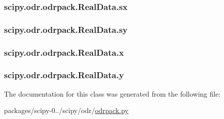 \subsubsection[{sx}]{\setlength{\rightskip}{0pt plus 5cm}scipy.\+odr.\+odrpack.\+Real\+Data.\+sx}\label{classscipy_1_1odr_1_1odrpack_1_1RealData_a0b61f9cdaabaac23a3a2a46a0719cf37}
\hypertarget{classscipy_1_1odr_1_1odrpack_1_1RealData_a56b11a5d3d7b1d9eaed36f1d9b701cb6}{}
\subsubsection[{sy}]{\setlength{\rightskip}{0pt plus 5cm}scipy.\+odr.\+odrpack.\+Real\+Data.\+sy}\label{classscipy_1_1odr_1_1odrpack_1_1RealData_a56b11a5d3d7b1d9eaed36f1d9b701cb6}
\hypertarget{classscipy_1_1odr_1_1odrpack_1_1RealData_a55d11a86068288d55f3d4f7566a027f7}{}
\subsubsection[{x}]{\setlength{\rightskip}{0pt plus 5cm}scipy.\+odr.\+odrpack.\+Real\+Data.\+x}\label{classscipy_1_1odr_1_1odrpack_1_1RealData_a55d11a86068288d55f3d4f7566a027f7}
\hypertarget{classscipy_1_1odr_1_1odrpack_1_1RealData_a3729ed46bfabdac27dffe13af65c0e10}{}
\subsubsection[{y}]{\setlength{\rightskip}{0pt plus 5cm}scipy.\+odr.\+odrpack.\+Real\+Data.\+y}\label{classscipy_1_1odr_1_1odrpack_1_1RealData_a3729ed46bfabdac27dffe13af65c0e10}


The documentation for this class was generated from the following file\+:\begin{DoxyCompactItemize}
\item 
packages/scipy-\/0../scipy/odr/\hyperlink{odrpack_8py}{odrpack.\+py}\end{DoxyCompactItemize}
